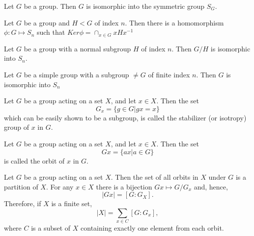 \begin{teo}
Let $G$ be a group. Then $G$ is isomorphic into the symmetric group $S_G$.
\end{teo}
\begin{teo}
    Let $G$ be a group and $H<G$ of index $n$. Then there is a homomorphism $\phi:G\mapsto S_n$ such that $Ker\phi=\cap_{x\in G}xHx^{-1}$
\end{teo}
\begin{coro}
    Let $G$ be a group with a normal subgroup $H$ of index $n$. Then $G/H$ is isomorphic into $S_n$.
\end{coro}
\begin{coro}
    Let $G$ be a simple group with a subgroup $\neq G$ of finite index $n$. Then $G$ is isomorphic into $S_n$
\end{coro}
\begin{defi}
    Let $G$ be a group acting on a set $X$, and let $x\in X$. Then the set 
    \begin{equation*}
        G_x=\{g\in G|gx=x\}
    \end{equation*}
    which can be easily shown to be a subgroup, is called the stabilizer (or isotropy) group of $x$ in $G$.
\end{defi}
\begin{defi}
    Let $G$ be a group acting on a set $X$, and let $x\in X$. Then the set 
    \begin{equation*}
        Gx=\{ax|a\in G\}
    \end{equation*}
    is called the orbit of $x$ in $G$.
\end{defi}
\begin{teo}
    Let $G$ be a group acting on a set $X$. Then the set of all orbits in $X$ under $G$ is a partition of $X$. For any $x\in X$ there is a bijection $Gx\mapsto G/G_x$ and, hence,
    \begin{equation*}
        |Gx|=[G:G_X].
    \end{equation*}
    Therefore, if $X$ is a finite set,
    \begin{equation*}
        |X|=\sum_{x\in C}[G:G_x],
    \end{equation*}
    where $C$ is a subset of $X$ containing exactly one element from each orbit.
\end{teo}
